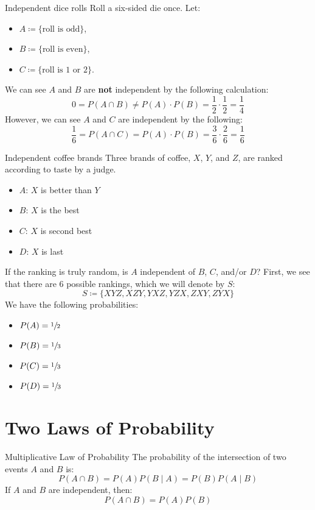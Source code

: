 \begin{exbox}{Independent dice rolls}{}
    Roll a six-sided die once. Let:
    \begin{itemize}
        \item $A \coloneq \{ \text{roll is odd} \}$,
        \item $B \coloneq \{ \text{roll is even} \}$,
        \item $C \coloneq \{ \text{roll is 1 or 2} \}$.
    \end{itemize}
    We can see $A$ and $B$ are \textbf{not} independent by the following calculation:
    \[ 0 = P(A \cap B) \neq P(A) \cdot P(B) = \frac{1}{2} \cdot \frac{1}{2} = \frac{1}{4} \]
    However, we can see $A$ and $C$ are independent by the following:
    \[ \frac{1}{6} = P(A \cap C) = P(A) \cdot P(B) = \frac36 \cdot \frac26 = \frac16 \]
\end{exbox}

\begin{exbox}{Independent coffee brands}{}
    Three brands of coffee, $X$, $Y$, and $Z$, are ranked according to taste by a judge.
    \begin{itemize}
        \item $A$: $X$ is better than $Y$
        \item $B$: $X$ is the best
        \item $C$: $X$ is second best
        \item $D$: $X$ is last
    \end{itemize}
    If the ranking is truly random, is $A$ independent of $B$, $C$, and/or $D$?
    \tcblower
    First, we see that there are $6$ possible rankings, which we will denote by $S$:
    \[ S \coloneq \{ XYZ, XZY, YXZ, YZX, ZXY, ZYX \} \]
    We have the following probabilities:
    \begin{itemize}
        \item $P(A) = \sfrac12$
        \item $P(B) = \sfrac13$
        \item $P(C) = \sfrac13$
        \item $P(D) = \sfrac13$
    \end{itemize}
\end{exbox}

\section{Two Laws of Probability}
\begin{thmbox}{Multiplicative Law of Probability}{}
    The probability of the intersection of two events $A$ and $B$ is:
    \[ P(A \cap B) = P(A)P(B \mid A) = P(B) P(A \mid B) \]
    If $A$ and $B$ are independent, then:
    \[ P(A \cap B) = P(A) P(B) \]
\end{thmbox}

